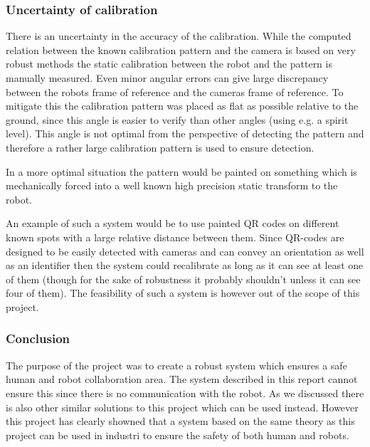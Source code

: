 \subsubsection{Uncertainty of calibration}
There is an uncertainty in the accuracy of the calibration. While the computed relation between the known calibration pattern and the camera is based on very robust methods the static calibration between the robot and the pattern is manually measured. Even minor angular errors can give large discrepancy between the robots frame of reference and the cameras frame of reference. To mitigate this the calibration pattern was placed as flat as possible relative to the ground, since this angle is easier to verify than other angles (using e.g. a spirit level). This angle is not optimal from the perspective of detecting the pattern and therefore a rather large calibration pattern is used to ensure detection.

In a more optimal situation the pattern would be painted on something which is mechanically forced into a well known high precision static transform to the robot.

An example of such a system would be to use painted QR codes on different known spots with a large relative distance between them. Since QR-codes are designed to be easily detected with cameras and can convey an orientation as well as an identifier then the system could recalibrate as long as it can see at least one of them (though for the sake of robustness it probably shouldn’t unless it can see four of them). The feasibility of such a system is however out of the scope of this project.

\subsubsection{Conclusion}

The purpose of the project was to create a robust system which ensures a safe human and robot collaboration area. The system described in this report cannot ensure this since there is no communication with the robot. As we discussed there is also other similar solutions to this project which can be used instead. However this project has clearly showned that a system based on the same theory as this project can be used in industri to ensure the safety of both human and robots. 
